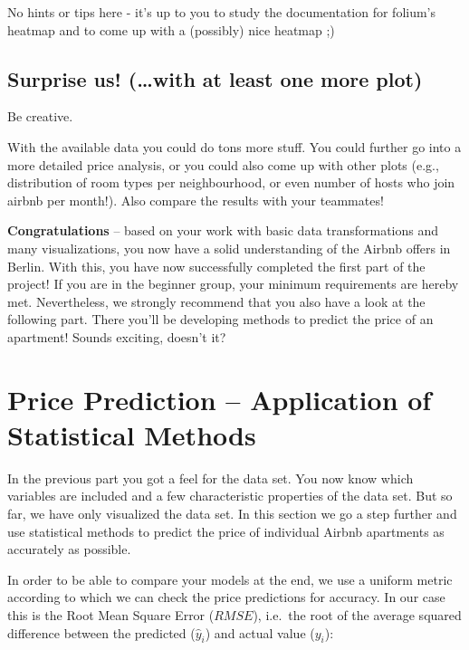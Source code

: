 \documentclass[
  11pt,
]{article}
\newenvironment{tipsp}[1]
  {
  \begin{itemize}
  \footnotesize
  \renewcommand{\labelitemi}{
    \raisebox{-.7\height}[0pt][0pt]{
      {\setkeys{Gin}{width=3em,keepaspectratio}
        \texttt{[image: images/\#1.png]}}
    }
  }
  \setlength{\fboxsep}{1em}
  \begin{pbox}
  \item
  }
  {
  \end{pbox}
  \end{itemize}
  }
\begin{document}
\begin{tipsp}p
No hints or tips here - it's up to you to study the documentation for folium's heatmap and to come up with a (possibly) nice heatmap ;)

\end{tipsp}

\hypertarget{surprise-us-with-at-least-one-more-plot}{%
\subsection{Surprise us! (\ldots with at least one more plot)}\label{surprise-us-with-at-least-one-more-plot}}

Be creative.

With the available data you could do tons more stuff. You could further go into a more detailed price analysis, or you could also come up with other plots (e.g., distribution of room types per neighbourhood, or even number of hosts who join airbnb per month!). Also compare the results with your teammates!

\textbf{Congratulations} -- based on your work with basic data transformations and many visualizations, you now have a solid understanding of the Airbnb offers in Berlin. With this, you have now successfully completed the first part of the project! If you are in the beginner group, your minimum requirements are hereby met. Nevertheless, we strongly recommend that you also have a look at the following part. There you'll be developing methods to predict the price of an apartment! Sounds exciting, doesn't it?

\newpage

\hypertarget{price-prediction-application-of-statistical-methods}{%
\section{Price Prediction -- Application of Statistical Methods}\label{price-prediction-application-of-statistical-methods}}

In the previous part you got a feel for the data set. You now know which variables are included and a few characteristic properties of the data set. But so far, we have only visualized the data set. In this section we go a step further and use statistical methods to predict the price of individual Airbnb apartments as accurately as possible.

In order to be able to compare your models at the end, we use a uniform metric according to which we can check the price predictions for accuracy. In our case this is the Root Mean Square Error (\(RMSE\)), i.e.~the root of the average squared difference between the predicted (\(\hat{y}_i\)) and actual value (\(y_i\)):
\end{document}
